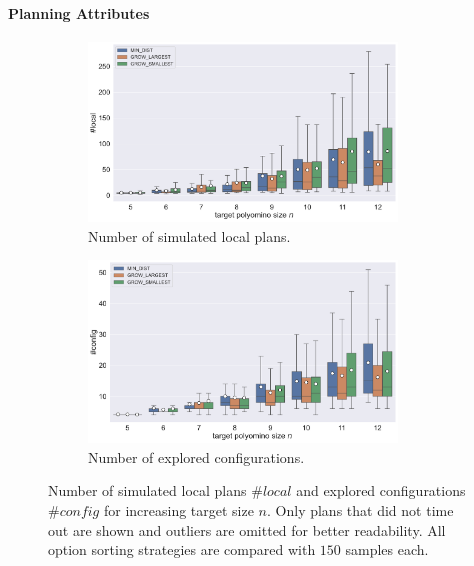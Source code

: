 \paragraph{Planning Attributes}

\begin{figure}
	\centering
	\begin{subfigure}[b]{\textwidth}
		\centering
		\includegraphics[width=0.9\textwidth]{figures/plots/AFN_nlocal.pdf}
		\caption{Number of simulated local plans.}
		\label{fig:AFN_nlocal}
	\end{subfigure}
	
	\begin{subfigure}[b]{\textwidth}
		\centering
		\includegraphics[width=0.9\textwidth]{figures/plots/AFN_nconfig.pdf}
		\caption{Number of explored configurations.}
		\label{fig:AFN_nconfig}
	\end{subfigure}
	\caption[Number of $\#\textit{local}$ and $\#\textit{config}$ for increasing target size]{Number of simulated local plans $\#\textit{local}$ and explored configurations $\#\textit{config}$ for increasing target size $n$. Only plans that did not time out are shown and outliers are omitted for better readability. All option sorting strategies are compared with $150$ samples each.}
	\label{fig:AFN_planstats}
\end{figure}

